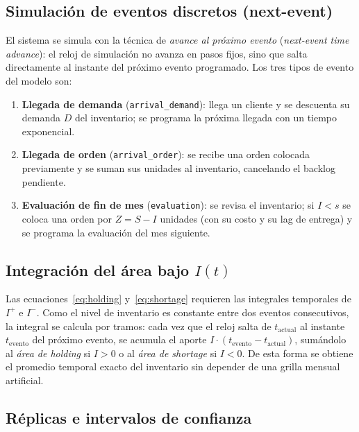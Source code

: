 \documentclass[11pt]{article}
\begin{document}
\subsection{Simulaci\'on de eventos discretos (next-event)}

El sistema se simula con la t\'ecnica de \emph{avance al pr\'oximo evento}
(\emph{next-event time advance}): el reloj de simulaci\'on no avanza en pasos
fijos, sino que salta directamente al instante del pr\'oximo evento
programado. Los tres tipos de evento del modelo son:

\begin{enumerate}
  \item \textbf{Llegada de demanda} (\texttt{arrival\_demand}): llega un
    cliente y se descuenta su demanda $D$ del inventario; se programa la
    pr\'oxima llegada con un tiempo exponencial.
  \item \textbf{Llegada de orden} (\texttt{arrival\_order}): se recibe una
    orden colocada previamente y se suman sus unidades al inventario,
    cancelando el backlog pendiente.
  \item \textbf{Evaluaci\'on de fin de mes} (\texttt{evaluation}): se revisa
    el inventario; si $I < s$ se coloca una orden por $Z = S - I$ unidades
    (con su costo y su lag de entrega) y se programa la evaluaci\'on del mes
    siguiente.
\end{enumerate}

\subsection{Integraci\'on del \'area bajo $I(t)$}

Las ecuaciones~\eqref{eq:holding} y~\eqref{eq:shortage} requieren las
integrales temporales de $I^{+}$ e $I^{-}$. Como el nivel de inventario es
constante entre dos eventos consecutivos, la integral se calcula por tramos:
cada vez que el reloj salta de $t_{\text{actual}}$ al instante
$t_{\text{evento}}$ del pr\'oximo evento, se acumula el aporte
$I \cdot (t_{\text{evento}} - t_{\text{actual}})$, sum\'andolo al
\emph{\'area de holding} si $I > 0$ o al \emph{\'area de shortage} si $I < 0$.
De esta forma se obtiene el promedio temporal exacto del inventario sin
depender de una grilla mensual artificial.

\subsection{R\'eplicas e intervalos de confianza}
\end{document}
